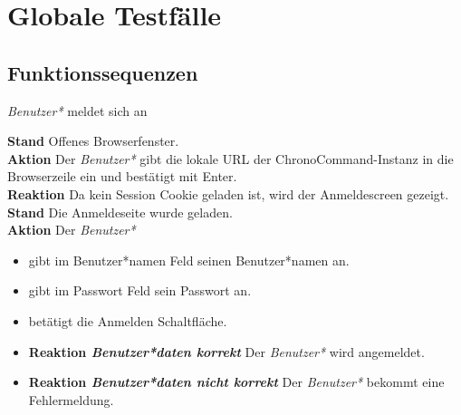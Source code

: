 \section{Globale Testfälle}

\subsection{Funktionssequenzen}
\begin{requirements}
	 \emph{Benutzer*} meldet sich an
	\begin{requirements}
  			    \textbf{Stand} Offenes Browserfenster. \\
  			    \textbf{Aktion} Der \emph{Benutzer*} gibt die lokale URL der ChronoCommand-Instanz in die Browserzeile ein und bestätigt mit Enter. \\
  			    \textbf{Reaktion} Da kein Session Cookie geladen ist, wird der Anmeldescreen gezeigt.
  			    \textbf{Stand} Die Anmeldeseite wurde geladen.\\
                \textbf{Aktion} Der \emph{Benutzer*}
                    \begin{itemize}
                        \item gibt im Benutzer*namen Feld seinen Benutzer*namen an.
                        \item gibt im Passwort Feld sein Passwort an.
                        \item betätigt die Anmelden Schaltfläche.
                    \end{itemize}
                \begin{itemize}
			\item \textbf{Reaktion \emph{Benutzer*daten korrekt}} Der \emph{Benutzer*} wird angemeldet.
			\item \textbf{Reaktion \emph{Benutzer*daten nicht korrekt}} Der \emph{Benutzer*} bekommt eine Fehlermeldung.
                \end{itemize}


\end{requirements}
\end{requirements}
